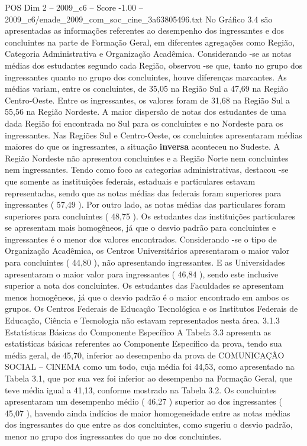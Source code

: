\begin{textsample}{POS Dim 2 – 2009\_c6 – Score -1.00 – 2009\_c6/enade\_2009\_com\_soc\_cine\_3a63805496.txt}
No Gráfico 3.4 são apresentadas as informações referentes ao desempenho dos ingressantes e dos concluintes na parte de Formação Geral, em diferentes agregações como Região, Categoria Administrativa e Organização Acadêmica.
Considerando -se as notas médias dos estudantes segundo cada Região, observou -se que, tanto no grupo dos ingressantes quanto no grupo dos concluintes, houve diferenças marcantes.
As médias variam, entre os concluintes, de 35,05 na Região Sul a 47,69 na Região Centro-Oeste.
Entre os ingressantes, os valores foram de 31,68 na Região Sul a 55,56 na Região Nordeste.
A maior dispersão de notas dos estudantes de uma dada Região foi encontrada no Sul para os concluintes e no Nordeste para os ingressantes.
Nas Regiões Sul e Centro-Oeste, os concluintes apresentaram médias maiores do que os ingressantes, a situação \textbf{inversa} aconteceu no Sudeste.
A Região Nordeste não apresentou concluintes e a Região Norte nem concluintes nem ingressantes.
Tendo como foco as categorias administrativas, destacou -se que somente as instituições federais, estaduais e particulares estavam representadas, sendo que as notas médias das federais foram superiores para ingressantes ( 57,49 ).
Por outro lado, as notas médias das particulares foram superiores para concluintes ( 48,75 ).
Os estudantes das instituições particulares se apresentam mais homogêneos, já que o desvio padrão para concluintes e ingressantes é o menor dos valores encontrados.
Considerando -se o tipo de Organização Acadêmica, os Centros Universitários apresentaram o maior valor para concluintes ( 44,80 ), não apresentando ingressantes.
E as Universidades apresentaram o maior valor para ingressantes ( 46,84 ), sendo este inclusive superior a nota dos concluintes.
Os estudantes das Faculdades se apresentam menos homogêneos, já que o desvio padrão é o maior encontrado em ambos os grupos.
Os Centros Federais de Educação Tecnológica e os Institutos Federais de Educação, Ciência e Tecnologia não estavam representados nesta área. 3.1.3 Estatísticas Básicas do Componente Específico A Tabela 3.3 apresenta as estatísticas básicas referentes ao Componente Específico da prova, tendo sua média geral, de 45,70, inferior ao desempenho da prova de COMUNICAÇÃO SOCIAL – CINEMA como um todo, cuja média foi 44,53, como apresentado na Tabela 3.1, que por sua vez foi inferior ao desempenho na Formação Geral, que teve média igual a 41,13, conforme mostrado na Tabela 3.2.
Os concluintes apresentaram um desempenho médio ( 46,27 ) superior ao dos ingressantes ( 45,07 ), havendo ainda indícios de maior homogeneidade entre as notas médias dos ingressantes do que entre as dos concluintes, como sugeriu o desvio padrão, menor no grupo dos ingressantes do que no dos concluintes.

\end{textsample}
